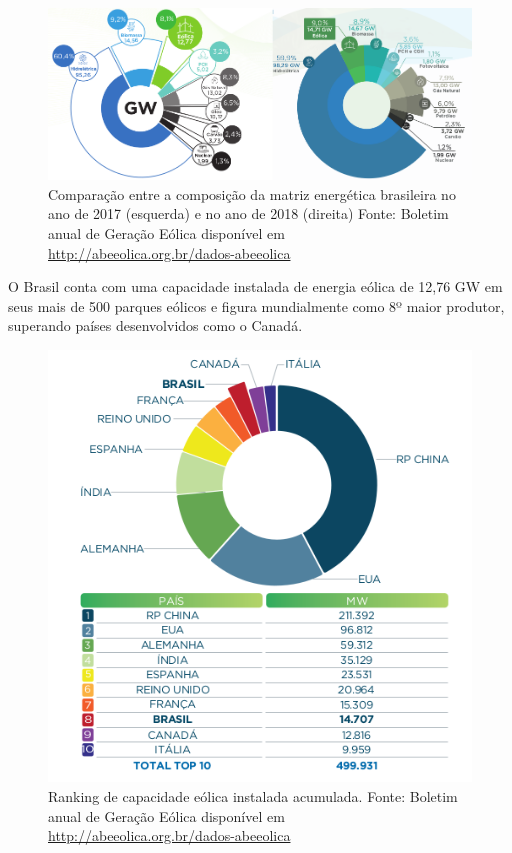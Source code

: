 \documentclass[
	12pt,				%
	openright,			%
	oneside,			%
	a4paper,			%
	english,			%
	french,				%
	spanish,			%
	brazil				%
	]{abntex2}
\begin{document}
\begin{figure}[h]
    \centering
	\includegraphics[width=\textwidth]{abe_2017_2018}
	\caption{Comparação entre a composição da matriz energética brasileira no ano de 2017 (esquerda) e no ano de 2018 (direita) Fonte: Boletim anual de Geração Eólica disponível em \url{http://abeeolica.org.br/dados-abeeolica}}
\end{figure}
\FloatBarrier

O Brasil conta com uma capacidade instalada de energia eólica de 12,76 GW em seus mais de 500 parques eólicos e figura mundialmente como 8º maior produtor, superando países desenvolvidos como o Canadá.

\begin{figure}[h]
    \centering
	\includegraphics[scale=0.6]{abe_maiores_produtores}
	\caption{Ranking de capacidade eólica instalada acumulada. Fonte: Boletim anual de Geração Eólica disponível em \url{http://abeeolica.org.br/dados-abeeolica}}
\end{figure}
\FloatBarrier
\end{document}

